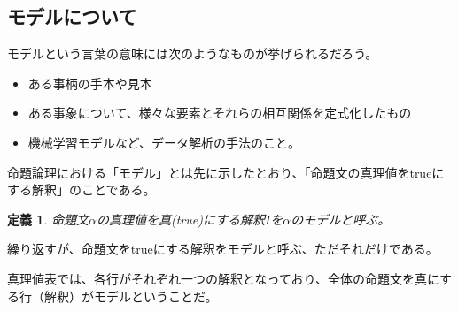 \documentclass[dvipdfmx]{jsarticle}
\newtheorem{dfn}{定義}
\begin{document}
\subsection{モデルについて}
モデルという言葉の意味には次のようなものが挙げられるだろう。
\begin{itemize}
  \item ある事柄の手本や見本
  \item ある事象について、様々な要素とそれらの相互関係を定式化したもの
  \item 機械学習モデルなど、データ解析の手法のこと。
\end{itemize}
命題論理における「モデル」とは先に示したとおり、「命題文の真理値をtrueにする解釈」のことである。
\begin{dfn}
  命題文$\alpha$の真理値を真(true)にする解釈$I$を$\alpha$のモデルと呼ぶ。
\end{dfn}
繰り返すが、命題文をtrueにする解釈をモデルと呼ぶ、ただそれだけである。\par
真理値表では、各行がそれぞれ一つの解釈となっており、全体の命題文を真にする行（解釈）がモデルということだ。
\end{document}
